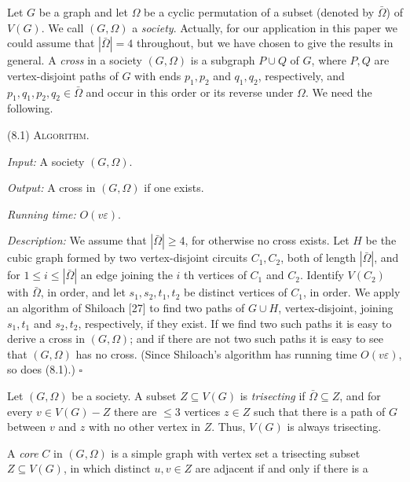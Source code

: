 
Let $G$ be a graph and let $\Omega$ be a cyclic permutation of a subset (denoted by $\bar{\Omega}$) of $V(G)$. We call $(G, \Omega)$ a \textit{society}. Actually, for our application in this paper we could assume that $|\bar{\Omega}| = 4$ throughout, but we have chosen to give the results in general. A \textit{cross} in a society $(G, \Omega)$ is a subgraph $P \cup Q$ of $G$, where $P, Q$ are vertex-disjoint paths of $G$ with ends $p_1, p_2$ and $q_1, q_2$, respectively, and $p_1, q_1, p_2, q_2 \in \bar{\Omega}$ and occur in this order or its reverse under $\Omega$. We need the following.

\stmt
(8.1) \textsc{Algorithm}.

\textit{Input:} A society $(G, \Omega)$.

\textit{Output:} A cross in $(G, \Omega)$ if one exists.

\textit{Running time:} $O(v\varepsilon)$.

\textit{Description:} We assume that $|\bar{\Omega}| \ge 4$, for otherwise no cross exists. Let $H$ be the cubic graph formed by two vertex-disjoint circuits $C_1, C_2$, both of length $|\bar{\Omega}|$, and for $1 \le i \le |\bar{\Omega}|$ an edge joining the $i$ th vertices of $C_1$ and $C_2$. Identify $V(C_2)$ with $\bar{\Omega}$, in order, and let $s_1, s_2, t_1, t_2$ be distinct vertices of $C_1$, in order. We apply an algorithm of Shiloach [27] to find two paths of $G \cup H$, vertex-disjoint, joining $s_1, t_1$ and $s_2, t_2$, respectively, if they exist. If we find two such paths it is easy to derive a cross in $(G, \Omega)$; and if there are not two such paths it is easy to see that $(G, \Omega)$ has no cross. (Since Shiloach's algorithm has running time $O(v\varepsilon)$, so does (8.1).) $\square$

Let $(G, \Omega)$ be a society. A subset $Z \subseteq V(G)$ is \textit{trisecting} if $\bar{\Omega} \subseteq Z$, and for every $v \in V(G) - Z$ there are $\le 3$ vertices $z \in Z$ such that there is a path of $G$ between $v$ and $z$ with no other vertex in $Z$. Thus, $V(G)$ is always trisecting.

A \textit{core} $C$ in $(G, \Omega)$ is a simple graph with vertex set a trisecting subset $Z \subseteq V(G)$, in which distinct $u, v \in Z$ are adjacent if and only if there is a
